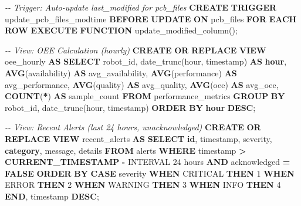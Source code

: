 \documentclass[
]{article}
\newenvironment{Shaded}{\begin{snugshade}}{\end{snugshade}}
\newcommand{\CommentTok}[1]{\textcolor[rgb]{0.56,0.35,0.01}{\textit{#1}}}
\newcommand{\ControlFlowTok}[1]{\textcolor[rgb]{0.13,0.29,0.53}{\textbf{#1}}}
\newcommand{\DataTypeTok}[1]{\textcolor[rgb]{0.13,0.29,0.53}{#1}}
\newcommand{\DecValTok}[1]{\textcolor[rgb]{0.00,0.00,0.81}{#1}}
\newcommand{\FunctionTok}[1]{\textcolor[rgb]{0.13,0.29,0.53}{\textbf{#1}}}
\newcommand{\KeywordTok}[1]{\textcolor[rgb]{0.13,0.29,0.53}{\textbf{#1}}}
\newcommand{\NormalTok}[1]{#1}
\newcommand{\OperatorTok}[1]{\textcolor[rgb]{0.81,0.36,0.00}{\textbf{#1}}}
\newcommand{\StringTok}[1]{\textcolor[rgb]{0.31,0.60,0.02}{#1}}
\begin{document}
\begin{Shaded}
\begin{Highlighting}[]
\CommentTok{{-}{-} Trigger: Auto{-}update last\_modified for pcb\_files}
\KeywordTok{CREATE} \KeywordTok{TRIGGER}\NormalTok{ update\_pcb\_files\_modtime}
\KeywordTok{BEFORE} \KeywordTok{UPDATE} \KeywordTok{ON}\NormalTok{ pcb\_files}
\ControlFlowTok{FOR} \KeywordTok{EACH} \KeywordTok{ROW}
\KeywordTok{EXECUTE} \KeywordTok{FUNCTION}\NormalTok{ update\_modified\_column();}

\CommentTok{{-}{-} View: OEE Calculation (hourly)}
\KeywordTok{CREATE} \KeywordTok{OR} \KeywordTok{REPLACE} \KeywordTok{VIEW}\NormalTok{ oee\_hourly }\KeywordTok{AS}
\KeywordTok{SELECT}
\NormalTok{    robot\_id,}
\NormalTok{    date\_trunc(}\StringTok{\textquotesingle{}hour\textquotesingle{}}\NormalTok{, }\DataTypeTok{timestamp}\NormalTok{) }\KeywordTok{AS} \KeywordTok{hour}\NormalTok{,}
    \FunctionTok{AVG}\NormalTok{(availability) }\KeywordTok{AS}\NormalTok{ avg\_availability,}
    \FunctionTok{AVG}\NormalTok{(performance) }\KeywordTok{AS}\NormalTok{ avg\_performance,}
    \FunctionTok{AVG}\NormalTok{(quality) }\KeywordTok{AS}\NormalTok{ avg\_quality,}
    \FunctionTok{AVG}\NormalTok{(oee) }\KeywordTok{AS}\NormalTok{ avg\_oee,}
    \FunctionTok{COUNT}\NormalTok{(}\OperatorTok{*}\NormalTok{) }\KeywordTok{AS}\NormalTok{ sample\_count}
\KeywordTok{FROM}\NormalTok{ performance\_metrics}
\KeywordTok{GROUP} \KeywordTok{BY}\NormalTok{ robot\_id, date\_trunc(}\StringTok{\textquotesingle{}hour\textquotesingle{}}\NormalTok{, }\DataTypeTok{timestamp}\NormalTok{)}
\KeywordTok{ORDER} \KeywordTok{BY} \KeywordTok{hour} \KeywordTok{DESC}\NormalTok{;}

\CommentTok{{-}{-} View: Recent Alerts (last 24 hours, unacknowledged)}
\KeywordTok{CREATE} \KeywordTok{OR} \KeywordTok{REPLACE} \KeywordTok{VIEW}\NormalTok{ recent\_alerts }\KeywordTok{AS}
\KeywordTok{SELECT}
    \KeywordTok{id}\NormalTok{,}
    \DataTypeTok{timestamp}\NormalTok{,}
\NormalTok{    severity,}
    \KeywordTok{category}\NormalTok{,}
\NormalTok{    message,}
\NormalTok{    details}
\KeywordTok{FROM}\NormalTok{ alerts}
\KeywordTok{WHERE} \DataTypeTok{timestamp} \OperatorTok{\textgreater{}} \FunctionTok{CURRENT\_TIMESTAMP} \OperatorTok{{-}} \DataTypeTok{INTERVAL} \StringTok{\textquotesingle{}24 hours\textquotesingle{}}
  \KeywordTok{AND}\NormalTok{ acknowledged }\OperatorTok{=} \KeywordTok{FALSE}
\KeywordTok{ORDER} \KeywordTok{BY}
    \ControlFlowTok{CASE}\NormalTok{ severity}
        \ControlFlowTok{WHEN} \StringTok{\textquotesingle{}CRITICAL\textquotesingle{}} \ControlFlowTok{THEN} \DecValTok{1}
        \ControlFlowTok{WHEN} \StringTok{\textquotesingle{}ERROR\textquotesingle{}} \ControlFlowTok{THEN} \DecValTok{2}
        \ControlFlowTok{WHEN} \StringTok{\textquotesingle{}WARNING\textquotesingle{}} \ControlFlowTok{THEN} \DecValTok{3}
        \ControlFlowTok{WHEN} \StringTok{\textquotesingle{}INFO\textquotesingle{}} \ControlFlowTok{THEN} \DecValTok{4}
    \ControlFlowTok{END}\NormalTok{,}
    \DataTypeTok{timestamp} \KeywordTok{DESC}\NormalTok{;}


\end{Highlighting}
\end{Shaded}
\end{document}
